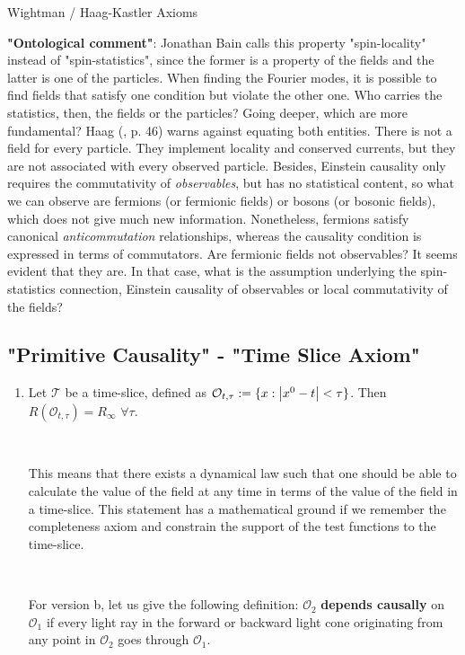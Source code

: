 \documentclass[12pt]{article}
\begin{document}
\begin{section}{Wightman / Haag-Kastler Axioms}
\

\textbf{"Ontological comment"}: Jonathan Bain \cite{bain_cpt_2013} calls this property "spin-locality" instead of "spin-statistics", since the former is a property of the fields and the latter is one of the particles. When finding the Fourier modes, it is possible to find fields that satisfy one condition but violate the other one. Who carries the statistics, then, the fields or the particles? Going deeper, which are more fundamental? Haag (\cite{haag_local_1996}, p. 46) warns against equating both entities. There is not a field for every particle. They implement locality and conserved currents, but they are not associated with every observed particle. Besides, Einstein causality only requires the commutativity of \textit{observables}, but has no statistical content, so what we can observe are fermions (or fermionic fields) or bosons (or bosonic fields), which does not give much new information. Nonetheless, fermions satisfy canonical \textit{anticommutation} relationships, whereas the causality condition is expressed in terms of commutators. Are fermionic fields not observables? It seems evident that they are. In that case, what is the assumption underlying the spin-statistics connection, Einstein causality of observables or local commutativity of the fields?

\subsection{"Primitive Causality" - "Time Slice Axiom"}

\begin{enumerate}
\item Let $\mathcal{T}$ be a time-slice, defined as $\mathcal{O}_{t,\tau} := \{ x: \abs{x^0 -t} < \tau \}$. Then $R(\mathcal{O}_{t,\tau})=R_\infty$ $\forall \tau$.

\

This means that there exists a dynamical law such that one should be able to calculate the value of the field at any time in terms of the value of the field in a time-slice. This statement has a mathematical ground if we remember the completeness axiom and constrain the support of the test functions to the time-slice.

\

For version b, let us give the following definition: $\mathcal{O}_2$ \textbf{depends causally} on $\mathcal{O}_1$ if every light ray in the forward or backward light cone originating from any point in $\mathcal{O}_2$ goes through $\mathcal{O}_1$.


\end{enumerate}
\end{section}
\end{document}

